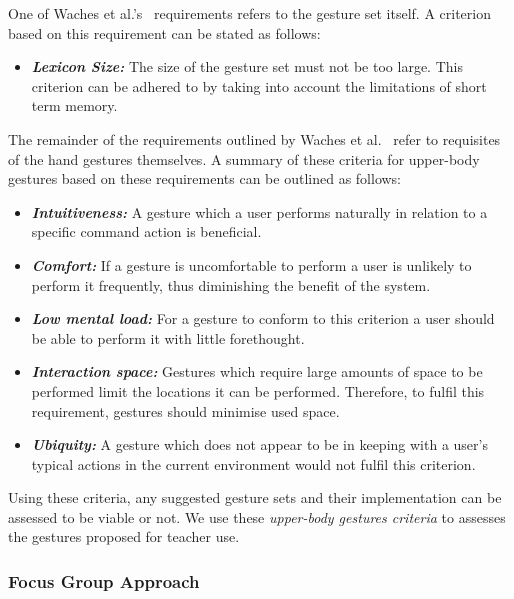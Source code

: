 \documentclass[link]{IWCOMP}
\begin{document}
One of Waches et al.'s~\citeyearpar{Wachs2011} requirements refers to the gesture set itself.
A criterion based on this requirement can be stated as follows:

\begin{itemize}
\item \textit{\textbf{Lexicon Size:}}  The size of the gesture set must not be too large.
This criterion can be adhered to by taking into account the limitations of short term memory.\\ 
\end{itemize}

The remainder of the requirements outlined by Waches et al.~\citeyearpar{Wachs2011} refer to requisites of the hand gestures themselves.
A summary of these criteria for upper-body gestures based on these requirements can be outlined as follows:

\begin{itemize}
\item \textit{\textbf{Intuitiveness:}} A gesture which a user performs naturally in relation to a specific command action is beneficial.
\item \textit{\textbf{Comfort:}} If a gesture is uncomfortable to perform a user is unlikely to perform it frequently, thus diminishing the benefit of the system.
\item \textit{\textbf{Low mental load:}} For a gesture to conform to this criterion a user should be able to perform it with little forethought.
\item \textit{\textbf{Interaction space:}} Gestures which require large amounts of space to be performed limit the locations it can be performed.
Therefore, to fulfil this requirement, gestures should minimise used space.
\item \textit{\textbf{Ubiquity:}} A gesture which does not appear to be in keeping with a user's typical actions in the current environment would not fulfil this criterion. \\ 
\end{itemize}

Using these criteria, any suggested gesture sets and their implementation can be assessed to be viable or not.
We use these \textit{upper-body gestures criteria} to assesses the gestures proposed for teacher use.

\subsubsection{Focus Group Approach} 
\label{subsec:focusGroupDesign}
\end{document}
